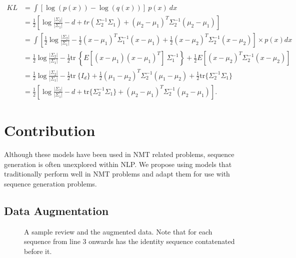 \documentclass[12pt,twoside]{report}
\begin{document}
\begin{equation}
	\label{eq:t}
	\begin{aligned}
	KL &= \int \left[\log( p(x)) - \log( q(x)) \right]\ p(x)\ dx \\
	&= \frac{1}{2}\left[\log\frac{|\Sigma_2|}{|\Sigma_1|} - d + tr(\Sigma_2^{-1}\Sigma_1) + (\mu_2 - \mu_1)^T \Sigma_2^{-1}(\mu_2 - \mu_1)\right] \\
	&= \int \left[ \frac{1}{2} \log\frac{|\Sigma_2|}{|\Sigma_1|} - \frac{1}{2} (x-\mu_1)^T\Sigma_1^{-1}(x-\mu_1) + \frac{1}{2} (x-\mu_2)^T\Sigma_2^{-1}(x-\mu_2) \right] \times p(x) dx \\
	&= \frac{1}{2} \log\frac{|\Sigma_2|}{|\Sigma_1|} - \frac{1}{2} \text{tr}\ \left\{E[(x - \mu_1)(x - \mu_1)^T] \ \Sigma_1^{-1} \right\} + \frac{1}{2} E[(x - \mu_2)^T \Sigma_2^{-1} (x - \mu_2)] \\
	&= \frac{1}{2} \log\frac{|\Sigma_2|}{|\Sigma_1|} - \frac{1}{2} \text{tr}\ \{I_d \} + \frac{1}{2} (\mu_1 - \mu_2)^T \Sigma_2^{-1} (\mu_1 - \mu_2) + \frac{1}{2} \text{tr} \{ \Sigma_2^{-1} \Sigma_1 \} \\
	&= \frac{1}{2}\left[\log\frac{|\Sigma_2|}{|\Sigma_1|} - d + \text{tr} \{ \Sigma_2^{-1}\Sigma_1 \} + (\mu_2 - \mu_1)^T \Sigma_2^{-1}(\mu_2 - \mu_1)\right].
\end{aligned}
\end{equation}



\chapter{Contribution}

Although these models have been used in NMT related problems, sequence generation is often unexplored within NLP. We propose using models that traditionally perform well in NMT problems and adapt them for use with sequence generation problems. 

\section{Data Augmentation}

\begin{figure}[!ht]
\centering


\caption{A sample review and the augmented data. Note that for each sequence from line 3 onwards has the identity sequence contatenated before it. \label{aug_1}}
\end{figure}
\end{document}
